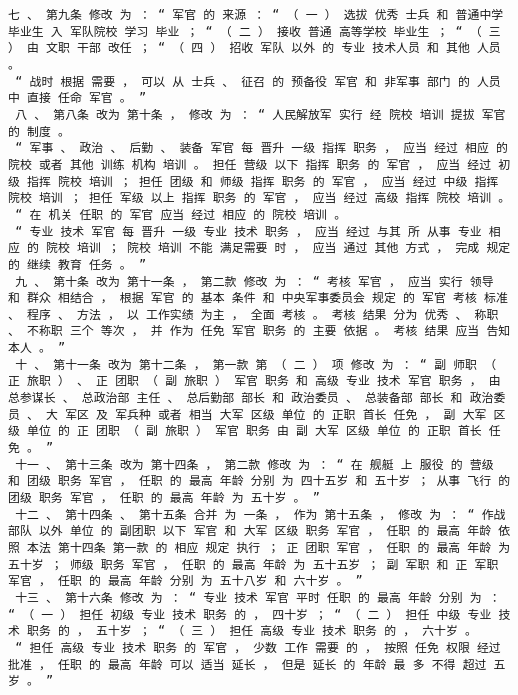 \documentclass{article}
\begin{document}
\begin{Verbatim}[commandchars=\\\{\}]
 七 、 第九条 修改 为 ： “ 军官 的 来源 ： “ （ 一 ） 选拔 优秀 士兵 和 普通中学 毕业生 入 军队院校 学习 毕业 ； “ （ 二 ） 接收 普通 高等学校 毕业生 ； “ （ 三 ） 由 文职 干部 改任 ； “ （ 四 ） 招收 军队 以外 的 专业 技术人员 和 其他 人员 。 
 “ 战时 根据 需要 ， 可以 从 士兵 、 征召 的 预备役 军官 和 非军事 部门 的 人员 中 直接 任命 军官 。 ” 
 八 、 第八条 改为 第十条 ， 修改 为 ： “ 人民解放军 实行 经 院校 培训 提拔 军官 的 制度 。 
 “ 军事 、 政治 、 后勤 、 装备 军官 每 晋升 一级 指挥 职务 ， 应当 经过 相应 的 院校 或者 其他 训练 机构 培训 。 担任 营级 以下 指挥 职务 的 军官 ， 应当 经过 初级 指挥 院校 培训 ； 担任 团级 和 师级 指挥 职务 的 军官 ， 应当 经过 中级 指挥 院校 培训 ； 担任 军级 以上 指挥 职务 的 军官 ， 应当 经过 高级 指挥 院校 培训 。 
 “ 在 机关 任职 的 军官 应当 经过 相应 的 院校 培训 。 
 “ 专业 技术 军官 每 晋升 一级 专业 技术 职务 ， 应当 经过 与其 所 从事 专业 相应 的 院校 培训 ； 院校 培训 不能 满足需要 时 ， 应当 通过 其他 方式 ， 完成 规定 的 继续 教育 任务 。 ” 
 九 、 第十条 改为 第十一条 ， 第二款 修改 为 ： “ 考核 军官 ， 应当 实行 领导 和 群众 相结合 ， 根据 军官 的 基本 条件 和 中央军事委员会 规定 的 军官 考核 标准 、 程序 、 方法 ， 以 工作实绩 为主 ， 全面 考核 。 考核 结果 分为 优秀 、 称职 、 不称职 三个 等次 ， 并 作为 任免 军官 职务 的 主要 依据 。 考核 结果 应当 告知 本人 。 ” 
 十 、 第十一条 改为 第十二条 ， 第一款 第 （ 二 ） 项 修改 为 ： “ 副 师职 （ 正 旅职 ） 、 正 团职 （ 副 旅职 ） 军官 职务 和 高级 专业 技术 军官 职务 ， 由 总参谋长 、 总政治部 主任 、 总后勤部 部长 和 政治委员 、 总装备部 部长 和 政治委员 、 大 军区 及 军兵种 或者 相当 大军 区级 单位 的 正职 首长 任免 ， 副 大军 区级 单位 的 正 团职 （ 副 旅职 ） 军官 职务 由 副 大军 区级 单位 的 正职 首长 任免 。 ” 
 十一 、 第十三条 改为 第十四条 ， 第二款 修改 为 ： “ 在 舰艇 上 服役 的 营级 和 团级 职务 军官 ， 任职 的 最高 年龄 分别 为 四十五岁 和 五十岁 ； 从事 飞行 的 团级 职务 军官 ， 任职 的 最高 年龄 为 五十岁 。 ” 
 十二 、 第十四条 、 第十五条 合并 为 一条 ， 作为 第十五条 ， 修改 为 ： “ 作战 部队 以外 单位 的 副团职 以下 军官 和 大军 区级 职务 军官 ， 任职 的 最高 年龄 依照 本法 第十四条 第一款 的 相应 规定 执行 ； 正 团职 军官 ， 任职 的 最高 年龄 为 五十岁 ； 师级 职务 军官 ， 任职 的 最高 年龄 为 五十五岁 ； 副 军职 和 正 军职 军官 ， 任职 的 最高 年龄 分别 为 五十八岁 和 六十岁 。 ” 
 十三 、 第十六条 修改 为 ： “ 专业 技术 军官 平时 任职 的 最高 年龄 分别 为 ： “ （ 一 ） 担任 初级 专业 技术 职务 的 ， 四十岁 ； “ （ 二 ） 担任 中级 专业 技术 职务 的 ， 五十岁 ； “ （ 三 ） 担任 高级 专业 技术 职务 的 ， 六十岁 。 
 “ 担任 高级 专业 技术 职务 的 军官 ， 少数 工作 需要 的 ， 按照 任免 权限 经过 批准 ， 任职 的 最高 年龄 可以 适当 延长 ， 但是 延长 的 年龄 最 多 不得 超过 五岁 。 ” 

\end{Verbatim}
\end{document}
